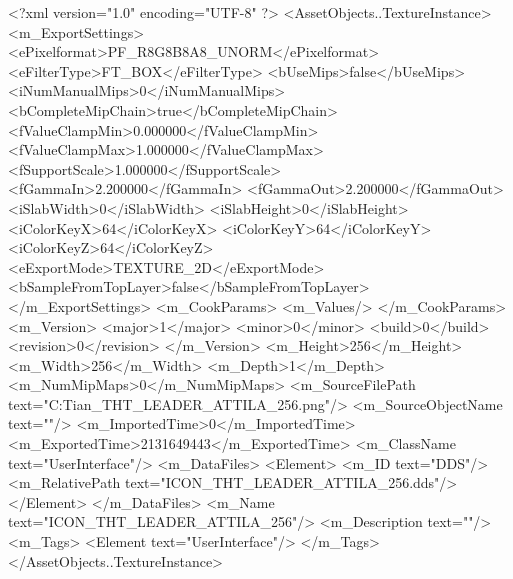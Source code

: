 <?xml version="1.0" encoding="UTF-8" ?>
<AssetObjects..TextureInstance>
	<m_ExportSettings>
		<ePixelformat>PF_R8G8B8A8_UNORM</ePixelformat>
		<eFilterType>FT_BOX</eFilterType>
		<bUseMips>false</bUseMips>
		<iNumManualMips>0</iNumManualMips>
		<bCompleteMipChain>true</bCompleteMipChain>
		<fValueClampMin>0.000000</fValueClampMin>
		<fValueClampMax>1.000000</fValueClampMax>
		<fSupportScale>1.000000</fSupportScale>
		<fGammaIn>2.200000</fGammaIn>
		<fGammaOut>2.200000</fGammaOut>
		<iSlabWidth>0</iSlabWidth>
		<iSlabHeight>0</iSlabHeight>
		<iColorKeyX>64</iColorKeyX>
		<iColorKeyY>64</iColorKeyY>
		<iColorKeyZ>64</iColorKeyZ>
		<eExportMode>TEXTURE_2D</eExportMode>
		<bSampleFromTopLayer>false</bSampleFromTopLayer>
	</m_ExportSettings>
	<m_CookParams>
		<m_Values/>
	</m_CookParams>
	<m_Version>
		<major>1</major>
		<minor>0</minor>
		<build>0</build>
		<revision>0</revision>
	</m_Version>
	<m_Height>256</m_Height>
	<m_Width>256</m_Width>
	<m_Depth>1</m_Depth>
	<m_NumMipMaps>0</m_NumMipMaps>
	<m_SourceFilePath text="C:\Users\Troy Tian\Downloads\ICON_THT_LEADER_ATTILA_256.png"/>
	<m_SourceObjectName text=""/>
	<m_ImportedTime>0</m_ImportedTime>
	<m_ExportedTime>2131649443</m_ExportedTime>
	<m_ClassName text="UserInterface"/>
	<m_DataFiles>
		<Element>
			<m_ID text="DDS"/>
			<m_RelativePath text="ICON_THT_LEADER_ATTILA_256.dds"/>
		</Element>
	</m_DataFiles>
	<m_Name text="ICON_THT_LEADER_ATTILA_256"/>
	<m_Description text=""/>
	<m_Tags>
		<Element text="UserInterface"/>
	</m_Tags>
</AssetObjects..TextureInstance>

